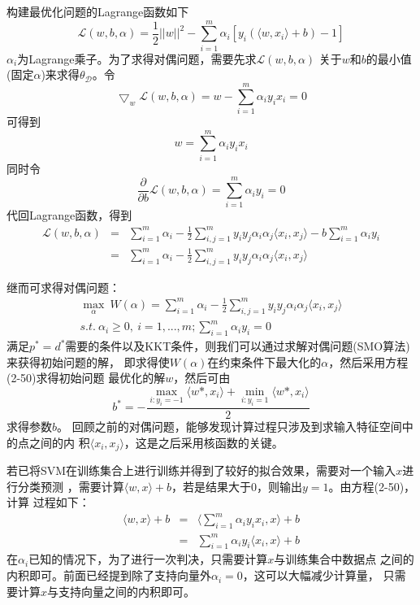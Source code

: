 构建最优化问题的Lagrange函数如下
\begin{equation}
    \mathcal{L}(w,b,\alpha)=\frac{1}{2}||w||^2-\sum^m_{i=1}\alpha_i
    [y_i(\langle{}w,x_i\rangle+b)-1]
\end{equation}
$\alpha_i$为Lagrange乘子。为了求得对偶问题，需要先求$\mathcal{L}(w,b,\alpha)$
关于$w$和$b$的最小值(固定$\alpha$)来求得$\theta_{\mathcal{D}}$。令
\begin{equation}
    \bigtriangledown_w\mathcal{L}(w,b,\alpha)=w-\sum^m_{i=1}\alpha_iy_ix_i=0
\end{equation}
可得到
\begin{equation}
    w=\sum^m_{i=1}\alpha_iy_ix_i
\end{equation}
同时令
\begin{equation}
    \frac{\partial}{\partial{}b}\mathcal{L}(w,b,\alpha)=\sum^m_{i=1}\alpha_iy_i=0
\end{equation}
代回Lagrange函数，得到
\begin{eqnarray}
    \mathcal{L}(w,b,\alpha)&=&\sum^m_{i=1}\alpha_i-\frac{1}{2}\sum^m_{i,j=1}
    y_iy_j\alpha_i\alpha_j\langle{}x_i,x_j\rangle-b\sum^m_{i=1}\alpha_iy_i\\
    {}&=&\sum^m_{i=1}\alpha_i-\frac{1}{2}\sum^m_{i,j=1}y_iy_j\alpha_i\alpha_j
    \langle{}x_i,x_j\rangle
\end{eqnarray}

继而可求得对偶问题：
\begin{eqnarray}
    \max_\alpha~W(\alpha)=\sum^m_{i=1}\alpha_i-\frac{1}{2}\sum^m_{i,j=1}y_iy_j\alpha_i\alpha_j
    \langle{}x_i,x_j\rangle\\
    s.t.~\alpha_i\geq0,~i=1,...,m;\sum_{i=1}^m\alpha_iy_i=0
\end{eqnarray}
满足$p^*=d^*$需要的条件以及KKT条件，则我们可以通过求解对偶问题(SMO算法)来获得初始问题的解，
即求得使$W(\alpha)$在约束条件下最大化的$\alpha$，然后采用方程(2-50)求得初始问题
最优化的解$w$，然后可由
\begin{equation}
    b^*=-\frac{\max_{i:y_i=-1}\langle{}w*,x_i\rangle+\min_{i:y_i=1}\langle{}w*,x_i
    \rangle}{2}
\end{equation}
求得参数$b$。
回顾之前的对偶问题，能够发现计算过程只涉及到求输入特征空间中的点之间的内
积$\langle{}x_i,x_j\rangle$，这是之后采用核函数的关键。

若已将SVM在训练集合上进行训练并得到了较好的拟合效果，需要对一个输入$x$进行分类预测
，需要计算$\langle{}w,x\rangle+b$，若是结果大于0，则输出$y=1$。由方程(2-50)，计算
过程如下：
\begin{eqnarray}
    \langle{}w,x\rangle+b&=&\langle\sum^m_{i=1}\alpha_iy_ix_i,x\rangle+b\\
    {}&=&\sum^m_{i=1}\alpha_iy_i\langle{}x_i,x\rangle+b
\end{eqnarray}
在$\alpha_i$已知的情况下，为了进行一次判决，只需要计算$x$与训练集合中数据点
之间的内积即可。前面已经提到除了支持向量外$\alpha_i=0$，这可以大幅减少计算量，
只需要计算$x$与支持向量之间的内积即可。

